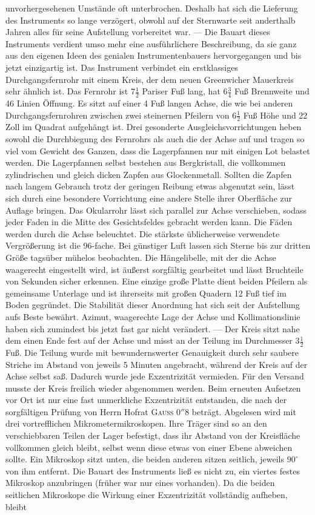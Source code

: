 unvorhergesehenen Umstände oft unterbrochen. Deshalb hat sich die Lieferung des Instruments so lange verzögert, obwohl auf der Sternwarte seit anderthalb Jahren alles für seine Aufstellung vorbereitet war. --- Die Bauart dieses Instruments verdient umso mehr eine ausführlichere Beschreibung, da sie ganz aus den eigenen Ideen des genialen Instrumentenbauers hervorgegangen und bis jetzt einzigartig ist. Das Instrument verbindet ein erstklassiges Durchgangsfernrohr mit einem Kreis, der dem neuen Greenwicher Mauerkreis sehr ähnlich ist. Das Fernrohr ist $7\frac{1}{2}$ Pariser Fuß lang, hat $6\frac{3}{4}$ Fuß Brennweite und 46 Linien Öffnung. Es sitzt auf einer 4 Fuß langen Achse, die wie bei anderen Durchgangsfernrohren zwischen zwei steinernen Pfeilern von $6\frac{1}{2}$ Fuß Höhe und 22 Zoll im Quadrat aufgehängt ist. Drei gesonderte Ausgleichsvorrichtungen heben sowohl die Durchbiegung des Fernrohrs als auch die der Achse auf und tragen so viel vom Gewicht des Ganzen, dass die Lagerpfannen nur mit einigen Lot belastet werden. Die Lagerpfannen  selbst bestehen aus Bergkristall, die vollkommen zylindrischen und gleich dicken Zapfen aus Glockenmetall. Sollten die Zapfen nach langem Gebrauch trotz der geringen Reibung etwas abgenutzt sein, lässt sich durch eine besondere Vorrichtung eine andere Stelle ihrer Oberfläche zur Auflage bringen. Das Okularrohr lässt sich parallel zur Achse verschieben, sodass jeder Faden in die Mitte des Gesichtsfeldes gebracht werden kann. Die Fäden werden durch die Achse beleuchtet. Die stärkste üblicherweise verwendete Vergrößerung ist die 96-fache. Bei günstiger Luft lassen sich Sterne bis zur dritten Größe tagsüber mühelos beobachten. Die Hängelibelle, mit der die Achse waagerecht eingestellt wird, ist äußerst sorgfältig gearbeitet und lässt Bruchteile von Sekunden sicher erkennen. Eine einzige große Platte dient beiden Pfeilern als gemeinsame Unterlage und ist ihrerseits mit großen Quadern 12 Fuß tief im Boden gegründet. Die Stabilität dieser Anordnung hat sich seit der Aufstellung aufs Beste bewährt. Azimut, waagerechte Lage der Achse und Kollimationslinie haben sich zumindest bis jetzt fast gar nicht verändert. --- Der Kreis sitzt nahe dem einen Ende fest auf der Achse und misst an der Teilung im Durchmesser $3\frac{1}{2}$ Fuß. Die Teilung wurde mit bewundernswerter Genauigkeit durch sehr saubere Striche im Abstand von jeweils 5 Minuten angebracht, während der Kreis auf der Achse selbst saß. Dadurch wurde jede Exzentrizität vermieden. Für den Versand musste der Kreis freilich wieder abgenommen werden. Beim erneuten Aufsetzen vor Ort ist nur eine fast unmerkliche Exzentrizität entstanden, die nach der sorgfältigen Prüfung von Herrn Hofrat \textsc{Gauss} $0''8$ beträgt. Abgelesen wird mit drei vortrefflichen Mikrometermikroskopen. Ihre Träger sind so an den verschiebbaren Teilen der Lager befestigt, dass ihr Abstand von der Kreisfläche vollkommen gleich bleibt, selbst wenn diese etwas von einer Ebene abweichen sollte. Ein Mikroskop sitzt unten, die beiden anderen sitzen seitlich, jeweils $90^\circ$ von ihm entfernt. Die Bauart des Instruments ließ es nicht zu, ein viertes festes Mikroskop anzubringen (früher war nur eines vorhanden). Da die beiden seitlichen Mikroskope die Wirkung einer Exzentrizität vollständig aufheben, bleibt 
